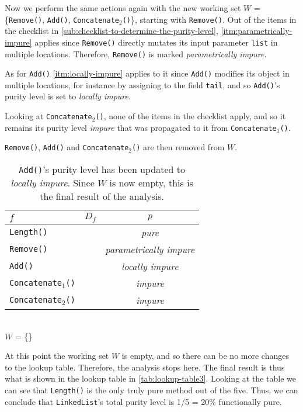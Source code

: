 \documentclass[a4paper,12pt]{article}
\begin{document}
Now we perform the same actions again with the new working set $W$ = \{\texttt{Remove()}, \texttt{Add()}, \texttt{Concatenate$_2$()}\}, starting with \texttt{Remove()}. Out of the items in the checklist in \autoref{sub:checklist-to-determine-the-purity-level}, \autoref{itm:parametrically-impure} applies since \texttt{Remove()} directly mutates its input parameter \texttt{list} in multiple locations. Therefore, \texttt{Remove()} is marked \textit{parametrically impure}.

As for \texttt{Add()} \autoref{itm:locally-impure} applies to it since \texttt{Add()} modifies its object in multiple locations, for instance by assigning to the field \texttt{tail}, and so \texttt{Add()}'s purity level is set to \textit{locally impure}.

Looking at \texttt{Concatenate$_2$()}, none of the items in the checklist apply, and so it remains its purity level \textit{impure} that was propagated to it from \texttt{Concatenate$_1$()}.

\texttt{Remove()}, \texttt{Add()} and \texttt{Concatenate$_2$()} are then removed from $W$.

\begin{table}[H]
  \caption{\texttt{Add()}'s purity level has been updated to \textit{locally impure}. Since $W$ is now empty, this is the final result of the analysis.}
  \label{tab:lookup-table3}
  \centering
  \begin{tabular}{|l|c|c|}
    \hline
    $f$                        & $D_f$                  & $p$                            \\ \hline
    \texttt{Length()}          &                        & \textit{pure}                         \\
    \texttt{Remove()}          &                        & \textit{parametrically impure}        \\
    \texttt{Add()}             &                        & \textit{locally impure}               \\
    \texttt{Concatenate$_1$()}  &                        & \textit{impure}                       \\
    \texttt{Concatenate$_2$()}  &                        & \textit{impure}                       \\ \hline
  \end{tabular}
  \\
  $W$ = \{\}
\end{table}

At this point the working set $W$ is empty, and so there can be no more changes to the lookup table. Therefore, the analysis stops here. The final result is thus what is shown in the lookup table in \autoref{tab:lookup-table3}. Looking at the table we can see that \texttt{Length()} is the only truly pure method out of the five. Thus, we can conclude that \texttt{LinkedList}'s total purity level is 1/5 = 20\% functionally pure.
\end{document}
